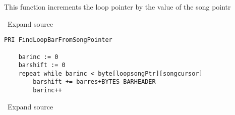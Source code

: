 
This function increments the loop pointer by the value of the song
pointr

\textbf{} ~Expand source

\lstset{style=spin}
\begin{lstlisting}
PRI FindLoopBarFromSongPointer

    barinc := 0
    barshift := 0
    repeat while barinc < byte[loopsongPtr][songcursor]
        barshift += barres+BYTES_BARHEADER
        barinc++
\end{lstlisting}


\textbf{} ~Expand source


